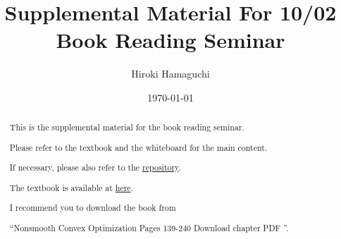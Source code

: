 \documentclass[a4paper, 14pt, dvipdfmx]{extarticle}
\begin{document}
\title{Supplemental Material For 10/02\\Book Reading Seminar}
\author{Hiroki Hamaguchi}
\date{\today}
\maketitle

\begin{abstract}
    \begin{center}
        This is the supplemental material for the book reading seminar.

        Please refer to the textbook and the whiteboard for the main content.

        If necessary, please also refer to the \href{https://github.com/hari64boli64/BookReadingSeminarMaterials}{repository}.

        The textbook is available at \href{https://link-springer-com.utokyo.idm.oclc.org/book/10.1007/978-3-319-91578-4}{here}.

        I recommend you to download the book from

        ``Nonsmooth Convex Optimization Pages 139-240 Download chapter PDF ''.


\end{center}
\end{abstract}
\end{document}
